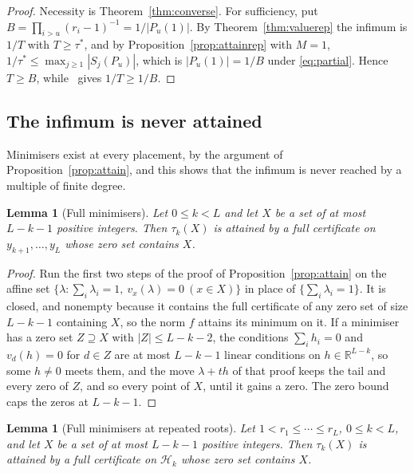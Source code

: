 \documentclass[11pt]{article}
\newtheorem{lemma}[theorem]{Lemma}
\theoremstyle{definition}
\theoremstyle{plain}
\newcommand{\R}{\mathbb R}
\begin{document}
\begin{proof}
Necessity is Theorem~\ref{thm:converse}.  For sufficiency, put
$B=\prod_{i>u}(r_i-1)^{-1}=1/|P_u(1)|$.  By Theorem~\ref{thm:valuerep} the
infimum is $1/T$ with $T\ge\tau^*$, and by Proposition~\ref{prop:attainrep}
with $M=1$, $1/\tau^*\le\max_{j\ge1}|S_j(P_u)|$, which is $|P_u(1)|=1/B$
under \eqref{eq:partial}.  Hence $T\ge B$, while~\cite[Theorem~3.2]{coefficient-mass} gives
$1/T\ge1/B$.
\end{proof}

\subsection*{The infimum is never attained}

Minimisers exist at every placement, by the argument of
Proposition~\ref{prop:attain}, and this shows that the infimum is never
reached by a multiple of finite degree.

\begin{lemma}[Full minimisers]\label{lem:attainX}
Let $0\le k<L$ and let $X$ be a set of at most $L-k-1$ positive integers.  Then
$\tau_k(X)$ is attained by a full certificate on $y_{k+1},\ldots,y_L$ whose
zero set contains $X$.
\end{lemma}

\begin{proof}
Run the first two steps of the proof of Proposition~\ref{prop:attain} on the
affine set $\{\lambda:\sum_i\lambda_i=1,\ v_x(\lambda)=0\ (x\in X)\}$ in place
of $\{\sum_i\lambda_i=1\}$.  It is closed, and nonempty because it contains the
full certificate of any zero set of size $L-k-1$ containing $X$, so the norm
$f$ attains its minimum on it.  If a minimiser has a zero set $Z\supseteq X$
with $|Z|\le L-k-2$, the conditions $\sum_ih_i=0$ and $v_d(h)=0$ for $d\in Z$
are at most $L-k-1$ linear conditions on $h\in\R^{L-k}$, so some $h\ne0$ meets
them, and the move $\lambda+th$ of that proof keeps the tail and every zero of
$Z$, and so every point of $X$, until it gains a zero.  The zero bound caps
the zeros at $L-k-1$.
\end{proof}

\begin{lemma}[Full minimisers at repeated roots]\label{lem:attainXrep}
Let $1<r_1\le\cdots\le r_L$, $0\le k<L$, and let $X$ be a set of at most
$L-k-1$ positive integers.  Then $\tau_k(X)$ is attained by a full
certificate on $\mathcal H_k$ whose zero set contains $X$.
\end{lemma}
\end{document}
